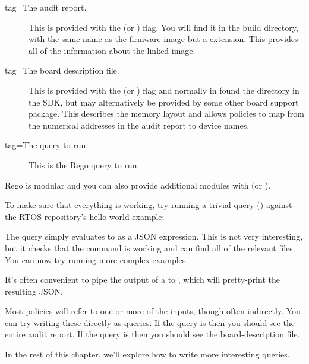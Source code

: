 \begin{description}
	\item[tag=The audit report.]{ This is provided with the  (or ) flag.
		You will find it in the build directory, with the same name as the firmware image but a  extension.
		This provides all of the information about the linked image.}
	\item[tag=The board description file.]{ This is provided with the  (or ) flag and normally in found the  directory in the SDK, but may alternatively be provided by some other board support package.
		This describes the memory layout and allows policies to map from the numerical addresses in the audit report to device names.}
	\item[tag=The query to run.]{ This is the Rego query to run.}
\end{description}

Rego is modular and you can also provide additional modules with  (or ).

To make sure that everything is working, try running a trivial query () against the RTOS repository's hello-world example:


The query  simply evaluates to  as a JSON expression.
This is not very interesting, but it checks that the command is working and can find all of the relevant files.
You can now try running more complex examples.

\begin{note}
	It's often convenient to pipe the output of a  to , which will pretty-print the resulting JSON.
\end{note}

Most policies will refer to one or more of the inputs, though often indirectly.
You can try writing these directly as queries.
If the query is  then you should see the entire audit report.
If the query is  then you should see the board-description file.

In the rest of this chapter, we'll explore how to write more interesting queries.

